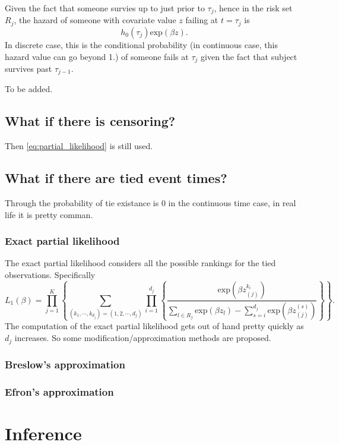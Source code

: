 \documentclass[a4paper,12pt]{article}
\begin{document}
Given the fact that someone survies up to just prior to $\tau_j$, hence in the risk set $R_j$, the hazard of someone with covariate value $z$ failing at $t = \tau_j$ is
\[
  h_0\left(\tau_j\right)\mathrm{exp}\left(\beta z\right)
  .
\]
In discrete case, this is the conditional probability {\color{blue}(in continuous case, this hazard value can go beyond 1.)} of someone fails at $\tau_j$ given the fact that subject survives past $\tau_{j - 1}$.
\par

{\color{red} To be added.}

\subsection{What if there is censoring?}
\label{sec:what-if-theres}

Then \eqref{eq:partial_likelihood} is still used.

\subsection{What if there are tied event times?}
\label{sec:what-if-there}

Through the probability of tie existance is 0 in the continuous time case, in real life it is pretty comman.

\subsubsection{Exact partial likelihood}
\label{sec:exact-part-likel}

The exact partial likelihood considers all the possible rankings for the tied observations. Specifically
\[
  L_1\left(\beta\right)
  = \prod\limits_{j = 1}^K
  \left\{
    \sum\limits_{
      \left(k_1, \cdots, k_{d_j}\right) = \left(1, 2, \cdots, d_j\right)
    }
    \prod\limits_{i = 1}^{d_j}\left\{
      \frac{
        \mathrm{exp}\left(\beta z_{\left(j\right)}^{k_i}\right)
      }{
        \sum_{l\in R_j}\mathrm{exp}\left(\beta z_l\right)
        - \sum\limits_{s = i}^{d_j}\mathrm{exp}\left(\beta z_{\left(j\right)}^{\left(s\right)}\right)
      }
    \right\}
  \right\}
  .
\]
The computation of the exact partial likelihood gets out of hand pretty quickly as $d_j$ increases. So some modification/approximation methods are proposed.

\subsubsection{Breslow's approximation}
\label{sec:bresl-appr}

\subsubsection{Efron's approximation}
\label{sec:efrons-approximation}




\section{Inference}
\label{sec:inference}






\end{document}
